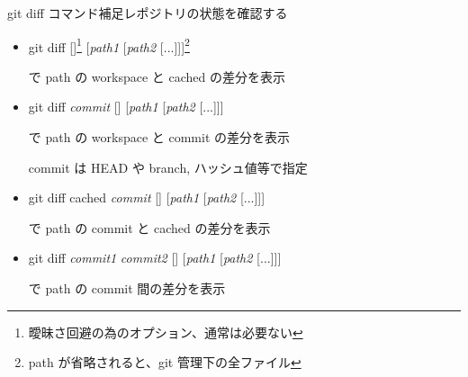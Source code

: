 \begin{frame}[t]{git diff コマンド補足}{レポジトリの状態を確認する}

  \begin{itemize}
  \item git diff [{\dhyphen}]\footnote{曖昧さ回避の為のオプション、通常は必要ない} [\textit{path1} [\textit{path2} [...]]]\footnote{path が省略されると、git 管理下の全ファイル}

    で path の workspace と cached の差分を表示
    \vspace{2ex}

  \item git diff \textit{commit} [{\dhyphen}] [\textit{path1} [\textit{path2} [...]]]

    で path の workspace と commit の差分を表示

    commit は HEAD や branch, ハッシュ値等で指定
    \vspace{2ex}

  \item git diff {\dhyphen}cached \textit{commit} [{\dhyphen}] [\textit{path1} [\textit{path2} [...]]]

    で path の commit と cached の差分を表示
    \vspace{2ex}

  \item git diff \textit{commit1} \textit{commit2} [{\dhyphen}] [\textit{path1} [\textit{path2} [...]]]

    で path の commit 間の差分を表示
  \end{itemize}

\end{frame}
